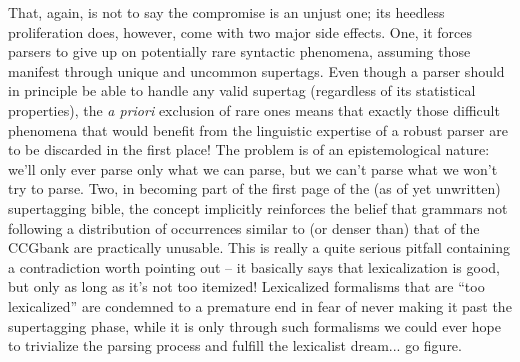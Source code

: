 That, again, is not to say the compromise is an unjust one; its heedless proliferation does, however, come with two major side effects.
One, it forces parsers to give up on potentially rare syntactic phenomena, assuming those manifest through unique and uncommon supertags.
Even though a parser should in principle be able to handle any valid supertag (regardless of its statistical properties), the \textit{a priori} exclusion of rare ones means that exactly those difficult phenomena that would benefit from the linguistic expertise of a robust parser are to be discarded in the first place!
The problem is of an epistemological nature: we'll only ever parse only what we can parse, but we can't parse what we won't try to parse.
Two, in becoming part of the first page of the (as of yet unwritten) supertagging bible, the concept implicitly reinforces the belief that grammars not following a distribution of occurrences similar to (or denser than) that of the CCGbank are practically unusable.
This is really a quite serious pitfall containing a contradiction worth pointing out -- it basically says that lexicalization is good, but only as long as it's not too itemized! 
Lexicalized formalisms that are ``too lexicalized'' are condemned to a premature end in fear of never making it past the supertagging phase, while it is only through such formalisms we could ever hope to trivialize the parsing process and fulfill the lexicalist dream... go figure.






%







